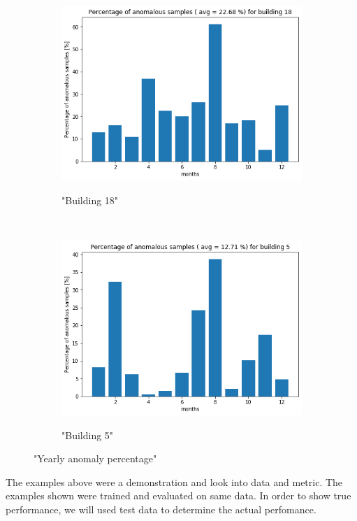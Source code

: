 \begin{figure}[H]
    \begin{subfigure}{.5\textwidth}
		\caption{"Building 18"}
		\includegraphics[width=1\linewidth]{../Figures/EC/b18year.png}
		\label{fig:ec_b18year}
	\end{subfigure}%
    ~ 
    \begin{subfigure}{.5\textwidth}
		\caption{"Building 5"}
		\includegraphics[width=1\linewidth]{../Figures/EC/b5year.png}
		\label{fig:ec_b5year}
	\end{subfigure}%
	\label{fig:ec_year}
	\caption{"Yearly anomaly percentage"}
\end{figure}


The examples above were a demonstration and look into data and metric. 
The examples shown were trained and evaluated on same data. 
In order to show true performance, we will used test data to determine the actual perfomance. 

